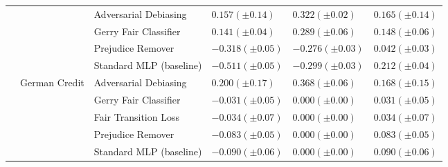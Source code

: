 \begin{tabular}{llllll}
 &  & Adversarial Debiasing & $0.157 (\pm0.14)$ & $0.322 (\pm0.02)$ & $0.165 (\pm0.14)$ \\
 &  & Gerry Fair Classifier & $0.141 (\pm0.04)$ & $0.289 (\pm0.06)$ & $0.148 (\pm0.06)$ \\
 &  & Prejudice Remover & $-0.318 (\pm0.05)$ & $-0.276 (\pm0.03)$ & $0.042 (\pm0.03)$ \\
 &  & Standard MLP (baseline) & $-0.511 (\pm0.05)$ & $-0.299 (\pm0.03)$ & $0.212 (\pm0.04)$ \\
\cline{2-6}
 & \multirow[t]{5}{*}{German Credit} & Adversarial Debiasing & $0.200 (\pm0.17)$ & $0.368 (\pm0.06)$ & $0.168 (\pm0.15)$ \\
 &  & Gerry Fair Classifier & $-0.031 (\pm0.05)$ & $0.000 (\pm0.00)$ & $0.031 (\pm0.05)$ \\
 &  & Fair Transition Loss & $-0.034 (\pm0.07)$ & $0.000 (\pm0.00)$ & $0.034 (\pm0.07)$ \\
 &  & Prejudice Remover & $-0.083 (\pm0.05)$ & $0.000 (\pm0.00)$ & $0.083 (\pm0.05)$ \\
 &  & Standard MLP (baseline) & $-0.090 (\pm0.06)$ & $0.000 (\pm0.00)$ & $0.090 (\pm0.06)$ \\
\cline{1-6} \cline{2-6}
\bottomrule
\end{tabular}

